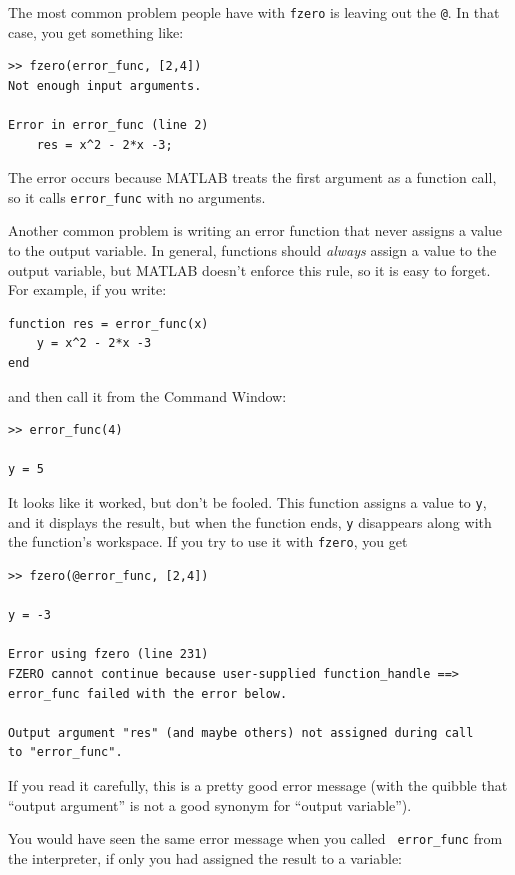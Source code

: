 \documentclass[
]{book}
\begin{document}
The most common problem people have with {\tt fzero} is leaving
out the {\tt @}.  In that case, you get something like:

\begin{verbatim}
>> fzero(error_func, [2,4])
Not enough input arguments.

Error in error_func (line 2)
    res = x^2 - 2*x -3;
\end{verbatim}

The error occurs because MATLAB treats the first argument as a function call,
so it calls {\tt error\_func} with no arguments.

Another common problem is writing an error function that never
assigns a value to the output variable.  In general, functions should
{\em always} assign a value to the output variable, but MATLAB doesn't
enforce this rule, so it is easy to forget.  For example, if you
write:

\begin{verbatim}
function res = error_func(x)
    y = x^2 - 2*x -3
end
\end{verbatim}

and then call it from the Command Window:

\begin{verbatim}
>> error_func(4)

y = 5
\end{verbatim}

It looks like it worked, but don't be fooled.  This function assigns
a value to {\tt y}, and it displays the result, but when the function
ends, {\tt y} disappears along with the function's workspace.
If you try to use it with {\tt fzero}, you get

\begin{verbatim}
>> fzero(@error_func, [2,4])

y = -3

Error using fzero (line 231)
FZERO cannot continue because user-supplied function_handle ==>
error_func failed with the error below.

Output argument "res" (and maybe others) not assigned during call
to "error_func".
\end{verbatim}

If you read it carefully, this is a pretty good error message
(with the quibble that ``output argument'' is not a good synonym
for ``output variable'').

You would have seen the same error message when you called {\tt
error\_func} from the interpreter, if only you had assigned the result
to a variable:
\end{document}
